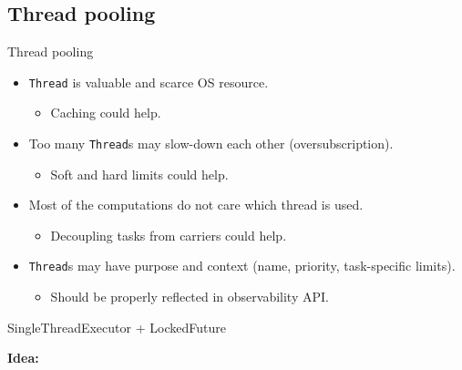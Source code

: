 
\subsection{Thread pooling}
\showTOCSub

\begin{frame}{Thread pooling}

\begin{itemize}
    \item \texttt{Thread} is valuable and scarce OS resource. 
    \begin{itemize} \item Caching could help. \end{itemize}
    \item Too many \texttt{Thread}s may slow-down each other (oversubscription). 
    \begin{itemize} \item Soft and hard limits could help. \end{itemize}
    \item Most of the computations do not care which thread is used. 
    \begin{itemize} \item Decoupling tasks from carriers could help. \end{itemize}
    \item \texttt{Thread}s may have purpose and context (name, priority, task-specific limits).
    \begin{itemize} \item  Should be properly reflected in observability API. \end{itemize}
\end{itemize}
\end{frame}

\begin{frame}[t,fragile]{SingleThreadExecutor + LockedFuture}

\textbf{Idea:}
\begin{itemize}
\end{itemize}
\end{frame}


